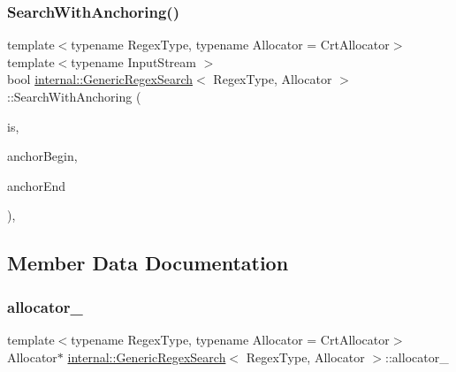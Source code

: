 \subsubsection{\texorpdfstring{Search\+With\+Anchoring()}{SearchWithAnchoring()}}
{\footnotesize\ttfamily template$<$typename Regex\+Type, typename Allocator = Crt\+Allocator$>$ \\
template$<$typename Input\+Stream $>$ \\
bool \hyperlink{classinternal_1_1GenericRegexSearch}{internal\+::\+Generic\+Regex\+Search}$<$ Regex\+Type, Allocator $>$\+::Search\+With\+Anchoring (\begin{DoxyParamCaption}\item[{Input\+Stream \&}]{is,  }\item[{bool}]{anchor\+Begin,  }\item[{bool}]{anchor\+End }\end{DoxyParamCaption})\hspace{0.3cm}{\ttfamily [inline]}, {\ttfamily [private]}}



\subsection{Member Data Documentation}
\mbox{\label{classinternal_1_1GenericRegexSearch_aa87a7caf0054f4e65446ecd91aba367c}} 
\subsubsection{\texorpdfstring{allocator\+\_\+}{allocator\_}}
{\footnotesize\ttfamily template$<$typename Regex\+Type, typename Allocator = Crt\+Allocator$>$ \\
Allocator$\ast$ \hyperlink{classinternal_1_1GenericRegexSearch}{internal\+::\+Generic\+Regex\+Search}$<$ Regex\+Type, Allocator $>$\+::allocator\+\_\+\hspace{0.3cm}{\ttfamily [private]}}

\mbox{\label{classinternal_1_1GenericRegexSearch_a804573e03eb673a9633f638fe3e3b62f}} 
